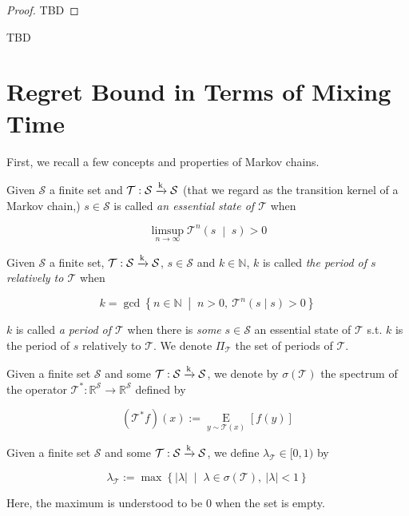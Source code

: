 \documentclass[anon,12pt]{colt2018} %
\newcommand{\AP}[1]{\left(#1\right)}
\newcommand{\AB}[1]{\left[#1\right]}
\newcommand{\APM}[2]{\left(#1\;\middle\vert\;#2\right)}
\newcommand{\ACM}[2]{\left\{#1\;\middle\vert\;#2\right\}}
\newcommand{\Ea}[2]{\underset{#1}{\operatorname{E}}\AB{#2}}
\newcommand{\Nats}{\mathbb{N}}
\newcommand{\Reals}{\mathbb{R}}
\newcommand{\Abs}[1]{\left\vert #1 \right\vert}
\newcommand{\K}{\xrightarrow{\textnormal{k}}}
\newcommand{\St}{\mathcal{S}}
\newcommand{\T}{\mathcal{T}}
\begin{document}
\begin{proof}

TBD
\end{proof}

TBD

\section{Regret Bound in Terms of Mixing Time}
\label{sec:mixing_time}

First, we recall a few concepts and properties of Markov chains.

\begin{samepage}
\begin{definition}

Given $\St$ a finite set and $\T: \St \K \St$ (that we regard as the transition kernel of a Markov chain,) $s \in \St$ is called \emph{an essential state of $\T$} when

\begin{equation}
\limsup_{n \rightarrow \infty} {\T^n\APM{s}{s}} > 0
\end{equation}

\end{definition}
\end{samepage}

\begin{samepage}
\begin{definition}

Given $\St$ a finite set, $\T: \St \K \St$, $s \in \St$ and $k \in \Nats$, $k$ is called \emph{the period of $s$ relatively to $\T$} when 

\begin{equation}
k = \gcd \ACM{n \in \Nats}{n > 0,\ \T^n(s \mid s) > 0}
\end{equation}

$k$ is called \emph{a period of $\T$} when there is \emph{some} $s \in \St$ an essential state of $\T$ s.t. $k$ is the period of $s$ relatively to $\T$. We denote $\Pi_\T$ the set of periods of $\T$.

\end{definition}
\end{samepage}

Given a finite set $\St$ and some $\T: \St \K \St$, we denote by $\sigma(\T)$ the spectrum of the operator $\T^*: \Reals^\St \rightarrow \Reals^\St$ defined by

\[\AP{\T^*f}(x):=\Ea{y\sim \T(x)}{f(y)}\]

\begin{samepage}
\begin{definition}

Given a finite set $\St$ and some $\T: \St \K \St$, we define $\lambda_\T\in[0,1)$ by

\begin{equation}
\lambda_\T := \max\ACM{\Abs{\lambda}}{\lambda \in \sigma\AP{\T},\ \Abs{\lambda} < 1}
\end{equation}

Here, the maximum is understood to be 0 when the set is empty.

\end{definition}
\end{samepage}
\end{document}
